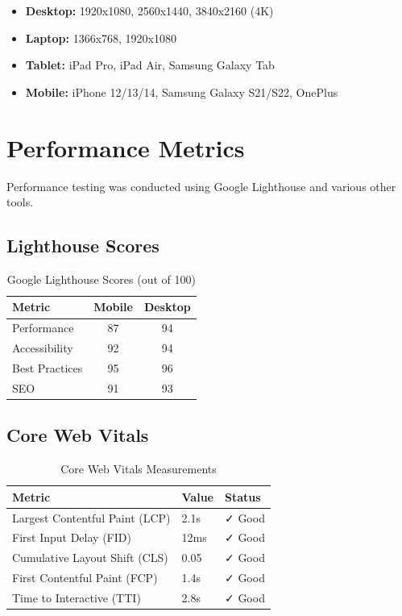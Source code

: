 \documentclass[12pt,a4paper]{report}
\begin{document}
\begin{itemize}
    \item \textbf{Desktop:} 1920x1080, 2560x1440, 3840x2160 (4K)
    \item \textbf{Laptop:} 1366x768, 1920x1080
    \item \textbf{Tablet:} iPad Pro, iPad Air, Samsung Galaxy Tab
    \item \textbf{Mobile:} iPhone 12/13/14, Samsung Galaxy S21/S22, OnePlus
\end{itemize}

\section{Performance Metrics}

Performance testing was conducted using Google Lighthouse and various other tools.

\subsection{Lighthouse Scores}

\begin{table}[H]
\centering
\begin{tabular}{|l|c|c|}
\hline
\textbf{Metric} & \textbf{Mobile} & \textbf{Desktop} \\ \hline
Performance & 87 & 94 \\ \hline
Accessibility & 92 & 94 \\ \hline
Best Practices & 95 & 96 \\ \hline
SEO & 91 & 93 \\ \hline
\end{tabular}
\caption{Google Lighthouse Scores (out of 100)}
\end{table}

\subsection{Core Web Vitals}

\begin{table}[H]
\centering
\begin{tabular}{|l|l|l|}
\hline
\textbf{Metric} & \textbf{Value} & \textbf{Status} \\ \hline
Largest Contentful Paint (LCP) & 2.1s & ✓ Good \\ \hline
First Input Delay (FID) & 12ms & ✓ Good \\ \hline
Cumulative Layout Shift (CLS) & 0.05 & ✓ Good \\ \hline
First Contentful Paint (FCP) & 1.4s & ✓ Good \\ \hline
Time to Interactive (TTI) & 2.8s & ✓ Good \\ \hline
\end{tabular}
\caption{Core Web Vitals Measurements}
\end{table}
\end{document}
